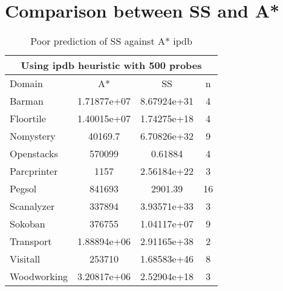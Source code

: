 \section{Comparison between SS and A*}


\begin{table}[]
\centering
\caption{Poor prediction of SS against A* ipdb}
\label{tb:pred_ss_a_ipdb}
\begin{tabular}{lccc}
\hline
\multicolumn{4}{c}{Using ipdb heuristic with 500 probes} \\ \hline
Domain         & A*             & SS             & n     \\ \hline
Barman         & 1.71877e+07    & 8.67924e+31    & 4     \\
Floortile      & 1.40015e+07    & 1.74275e+18    & 4     \\
Nomystery      & 40169.7        & 6.70826e+32    & 9     \\
Openstacks     & 570099         & 0.61884        & 4     \\
Parcprinter    & 1157           & 2.56184e+22    & 3     \\
Pegsol         & 841693         & 2901.39        & 16    \\
Scanalyzer     & 337894         & 3.93571e+33    & 3     \\
Sokoban        & 376755         & 1.04117e+07    & 9     \\
Transport      & 1.88894e+06    & 2.91165e+38    & 2     \\
Visitall       & 253710         & 1.68583e+46    & 8     \\
Woodworking    & 3.20817e+06    & 2.52904e+18    & 3     \\ \hline
\end{tabular}
\end{table}



